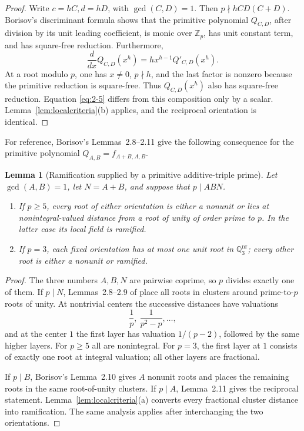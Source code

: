 \documentclass[11pt]{article}
\numberwithin{equation}{section}
\newtheorem{lemma}[theorem]{Lemma}
\theoremstyle{definition}
\newcommand{\Q}{\mathbb Q}
\newcommand{\Z}{\mathbb Z}
\begin{document}
\begin{proof}
Write \(c=hC,d=hD\), with \(\gcd(C,D)=1\).  Then
\(p\nmid hCD(C+D)\).  Borisov's discriminant formula
\cite[Lemma~2.1]{Borisov1998} shows that the primitive polynomial
\(Q_{C,D}\), after division by its unit leading coefficient, is monic over
\(\Z_p\), has unit constant term, and has square-free reduction.
Furthermore,
\[
 \frac{d}{dx}Q_{C,D}(x^h)=hx^{h-1}Q'_{C,D}(x^h).
\]
At a root modulo \(p\), one has \(x\neq0\), \(p\nmid h\), and the last
factor is nonzero because the primitive reduction is square-free.  Thus
\(Q_{C,D}(x^h)\) also has square-free reduction.  Equation \eqref{eq:2-5} differs
from this composition only by a scalar.  Lemma~\ref{lem:localcriteria}(b)
applies, and the reciprocal orientation is identical.
\end{proof}

For reference, Borisov's Lemmas~2.8--2.11 give the following consequence for
the primitive polynomial \(Q_{A,B}=f_{A+B,A,B}\).

\begin{lemma}[Ramification supplied by a primitive additive-triple prime]
\label{lem:borisovramification}
Let \(\gcd(A,B)=1\), let \(N=A+B\), and suppose that \(p\mid ABN\).
\begin{enumerate}[label=(\alph*)]
\item If \(p\geq5\), every root of either orientation is either a nonunit or
lies at nonintegral-valued distance from a root of unity of order prime to
\(p\).  In the latter case its local field is ramified.
\item If \(p=3\), each fixed orientation has at most one unit root in
\(\Q_3^{\mathrm{nr}}\); every other root is either a nonunit or ramified.
\end{enumerate}
\end{lemma}

\begin{proof}
The three numbers \(A,B,N\) are pairwise coprime, so \(p\) divides exactly
one of them.  If \(p\mid N\), Lemmas~2.8--2.9 of \cite{Borisov1998} place
all roots in clusters around prime-to-\(p\) roots of unity.  At nontrivial
centers the successive distances have valuations
\[
 \frac1p,\ \frac1{p^2-p},\ldots,
\]
and at the center \(1\) the first layer has valuation \(1/(p-2)\), followed
by the same higher layers.  For \(p\geq5\) all are nonintegral.  For
\(p=3\), the first layer at \(1\) consists of exactly one root at integral
valuation; all other layers are fractional.

If \(p\mid B\), Borisov's Lemma~2.10 gives \(A\) nonunit roots and places
the remaining roots in the same root-of-unity clusters.  If \(p\mid A\),
Lemma~2.11 gives the reciprocal statement.  Lemma~\ref{lem:localcriteria}(a)
converts every fractional cluster distance into ramification.  The same
analysis applies after interchanging the two orientations.
\end{proof}
\end{document}
